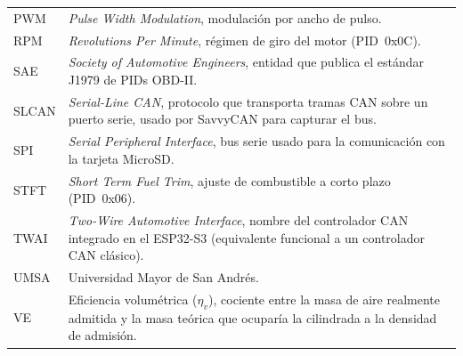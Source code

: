 \begin{longtable}{@{}p{2.6cm}p{11.5cm}@{}}
	PWM & \textit{Pulse Width Modulation}, modulación por ancho de pulso. \\
	RPM & \textit{Revolutions Per Minute}, régimen de giro del motor (PID~0x0C). \\
	SAE & \textit{Society of Automotive Engineers}, entidad que publica el estándar J1979 de PIDs OBD-II. \\
	SLCAN & \textit{Serial-Line CAN}, protocolo que transporta tramas CAN sobre un puerto serie, usado por SavvyCAN para capturar el bus. \\
	SPI & \textit{Serial Peripheral Interface}, bus serie usado para la comunicación con la tarjeta MicroSD. \\
	STFT & \textit{Short Term Fuel Trim}, ajuste de combustible a corto plazo (PID~0x06). \\
	TWAI & \textit{Two-Wire Automotive Interface}, nombre del controlador CAN integrado en el ESP32-S3 (equivalente funcional a un controlador CAN clásico). \\
	UMSA & Universidad Mayor de San Andrés. \\
	VE & Eficiencia volumétrica ($\eta_v$), cociente entre la masa de aire realmente admitida y la masa teórica que ocuparía la cilindrada a la densidad de admisión. \\
	\bottomrule
\end{longtable}

